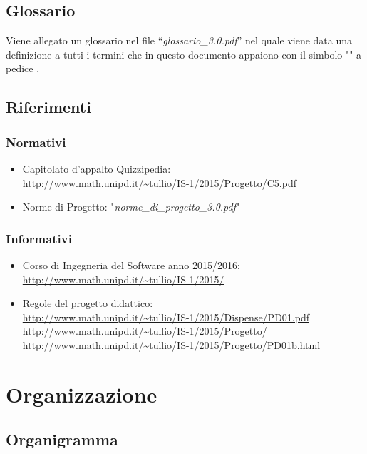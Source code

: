 \documentclass[a4paper,11pt]{article}
\begin{document}
	\subsection{Glossario}
	Viene allegato un glossario nel file ``\textit{glossario\_3.0.pdf}'' nel quale viene data una definizione a tutti i termini che in questo documento appaiono con il simbolo "\addglos" a pedice .
	\subsection{Riferimenti}
		\subsubsection{Normativi}
		\begin{itemize}
			\item Capitolato d'appalto Quizzipedia:\\
			\url{http://www.math.unipd.it/~tullio/IS-1/2015/Progetto/C5.pdf}
			\item Norme di Progetto: "\textit{norme\_di\_progetto\_3.0.pdf}"
		\end{itemize}
		\subsubsection{Informativi}
		\begin{itemize}
			\item Corso di Ingegneria del Software anno 2015/2016:\\
			\url{http://www.math.unipd.it/~tullio/IS-1/2015/}
			\item Regole del progetto didattico:\\
			\url{http://www.math.unipd.it/~tullio/IS-1/2015/Dispense/PD01.pdf}
			\url{http://www.math.unipd.it/~tullio/IS-1/2015/Progetto/}\\
			\url{http://www.math.unipd.it/~tullio/IS-1/2015/Progetto/PD01b.html}
		\end{itemize}
	\pagebreak
	
	\newpage
	\section{Organizzazione}	
	\subsection{Organigramma}
\end{document}
